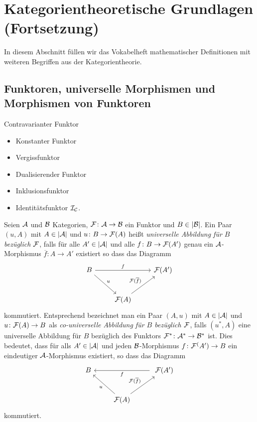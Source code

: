 \section{Kategorientheoretische Grundlagen (Fortsetzung)}

In diesem Abschnitt füllen wir das Vokabelheft mathematischer Definitionen mit weiteren Begriffen aus der Kategorientheorie.

\subsection{Funktoren, universelle Morphismen und Morphismen von Funktoren}

\begin{defn}
  
\end{defn}

Contravarianter Funktor

\begin{ex}
  \begin{itemize}
    \item Konstanter Funktor
    \item Vergissfunktor
    \item Dualisierender Funktor
    \item Inklusionsfunktor
    \item Identitätsfunktor $\mathcal{I}_{\mathcal{C}}$.
  \end{itemize}
\end{ex}

\begin{defn}
  Seien $\mathcal{A}$ und $\mathcal{B}$ Kategorien, $\mathcal{F} \colon \mathcal{A} \to \mathcal{B}$ ein Funktor und $B \in |\mathcal{B}|$.
  Ein Paar $(u, A)$ mit $A \in |\mathcal{A}|$ und $u \colon B \to \mathcal{F}(A)$ heißt \emph{universelle Abbildung für $B$ bezüglich $\mathcal{F}$}, falls für alle $A' \in |\mathcal{A}|$ und alle $f \colon B \to \mathcal{F}(A')$ genau ein $\mathcal{A}$-Morphismus $\overline f \colon A \to A'$ existiert so dass das Diagramm
  $$
  \begin{tikzcd}[row sep=2.5em]
    B \arrow[rd,"u"] \arrow[rr, "f"] &&\F(A') \\
    &\F(A) \arrow[ru, "\F(\overline{f})"]
  \end{tikzcd}
  $$
  kommutiert.
  Entsprechend bezeichnet man ein Paar $(A,u)$ mit $A \in |\mathcal{A}|$ und $u \colon \mathcal{F}(A) \to B$ als \emph{co-universelle Abbildung für $B$ bezüglich $\mathcal{F}$}, falls $(u^*, A)$ eine universelle Abbildung für $B$ bezüglich des Funktors $\mathcal{F}^* \colon \mathcal{A}^* \to \mathcal{B}^*$ ist.
  Dies bedeutet, dass für alls $A' \in |\mathcal{A}|$ und jeden $\mathcal{B}$-Morphismus $f \colon \mathcal{F}^(A') \to B$ ein eindeutiger $\mathcal{A}$-Morphismus existiert, so dass das Diagramm
  $$
  \begin{tikzcd}[row sep=2.5em]
    B  && \ \arrow[ll, "f"] \F(A') \\
    & \arrow[lu,"u"] \F(A)\arrow[ru, "\F(\overline{f})"] & 
  \end{tikzcd}
  $$
  kommutiert.
\end{defn}

